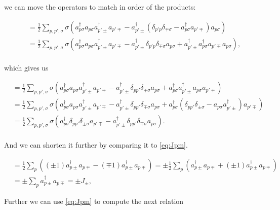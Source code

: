 we can move the operators to match in order of the products:

\begin{align*}
[J_z,J_\pm] &= \frac{1}{2} \sum_{p,p',\sigma} \sigma \left(
a_{p\sigma}^\dagger a_{p\sigma} a_{p'\pm}^\dagger a_{p'\mp} -
a_{p'\pm}^\dagger \left( \delta_{p' p} \delta_{\mp \sigma} - a_{p\sigma}^\dagger a_{p'\mp} \right) a_{p\sigma} \right) \\
&= \frac{1}{2} \sum_{p,p',\sigma} \sigma \left(
a_{p\sigma}^\dagger a_{p\sigma} a_{p'\pm}^\dagger a_{p'\mp} -
a_{p'\pm}^\dagger \delta_{p' p} \delta_{\mp \sigma} a_{p\sigma} +
a_{p'\pm}^\dagger a_{p\sigma}^\dagger a_{p'\mp} a_{p\sigma} \right), \\
\end{align*}

which gives us

\begin{align*}
[J_z,J_\pm]
&= \frac{1}{2} \sum_{p,p',\sigma} \sigma \left(
a_{p\sigma}^\dagger a_{p\sigma} a_{p'\pm}^\dagger a_{p'\mp} -
a_{p'\pm}^\dagger \delta_{pp'} \delta_{\mp \sigma} a_{p\sigma} +
a_{p\sigma}^\dagger a_{p'\pm}^\dagger a_{p\sigma} a_{p'\mp} \right) \\
&= \frac{1}{2} \sum_{p,p',\sigma} \sigma \left(
a_{p\sigma}^\dagger a_{p\sigma} a_{p'\pm}^\dagger a_{p'\mp} -
a_{p'\pm}^\dagger \delta_{pp'} \delta_{\mp \sigma} a_{p\sigma} +
a_{p\sigma}^\dagger \left( \delta_{pp'} \delta_{\pm \sigma} - a_{p\sigma} a_{p'\pm}^\dagger \right) a_{p'\mp} \right) \\
&= \frac{1}{2} \sum_{p,p',\sigma} \sigma \left(
a_{p\sigma}^\dagger \delta_{pp'} \delta_{\pm \sigma} a_{p'\mp} -
a_{p'\pm}^\dagger \delta_{pp'} \delta_{\mp \sigma} a_{p\sigma} \right). \\
\end{align*}

And we can shorten it further by comparing it to \ref{eq:Jpm}.

\begin{align*}
[J_z,J_\pm] &= \frac{1}{2} \sum_p \left(
(\pm 1) a_{p\pm}^\dagger a_{p\mp} - (\mp 1)
a_{p\pm}^\dagger a_{p\mp} \right) =
\pm \frac{1}{2} \sum_p \left(
a_{p\pm}^\dagger a_{p\mp} + (\pm 1)
a_{p\pm}^\dagger a_{p\mp} \right) \\
&= \pm \sum_p a_{p\pm}^\dagger a_{p\mp} = \pm J_\pm,
\end{align*}

Further we can use \ref{eq:Jpm} to compute the next relation

